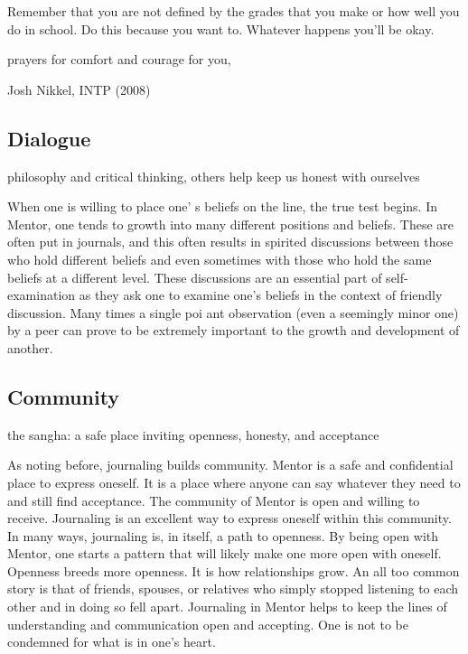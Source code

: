 \begin{center}
\begin{changemargin}{0.5cm}{0.5cm}
Remember that you are not defined by the grades that you make or how well you do in school.  Do this because you want to.  Whatever happens you'll be okay.

prayers for comfort and courage for you,

\begin{flushright}
	Josh Nikkel, INTP (2008)
\end{flushright}

\end{changemargin}
\end{center}


\subsection{Dialogue}

philosophy and critical thinking, others help keep us honest with ourselves


When one is willing to place one' s beliefs on the line, the true test
begins. In Mentor, one tends to growth into many different positions
and beliefs. These are often put in journals, and this often results
in spirited discussions between those who hold different beliefs and
even sometimes with those who hold the same beliefs at a different
level. These discussions are an essential part of self-examination as
they ask one to examine one's beliefs in the context of friendly
discussion. Many times a single poi ant observation (even a seemingly
minor one) by a peer can prove to be extremely important to the growth
and development of another.


\subsection{Community}

the sangha: a safe place inviting openness, honesty, and acceptance

As noting before, journaling builds community. Mentor is a safe and
confidential place to express oneself. It is a place where anyone can
say whatever they need to and still find acceptance. The community of
Mentor is open and willing to receive. Journaling is an excellent way
to express oneself within this community. In many ways, journaling is,
in itself, a path to openness. By being open with Mentor, one starts a
pattern that will likely make one more open with oneself. Openness
breeds more openness. It is how relationships grow. An all too common
story is that of friends, spouses, or relatives who simply stopped
listening to each other and in doing so fell apart. Journaling in
Mentor helps to keep the lines of understanding and communication open
and accepting. One is not to be condemned for what is in one's heart.


